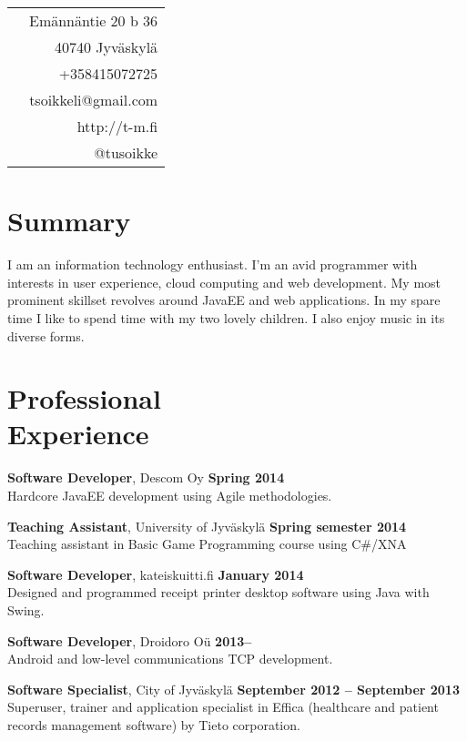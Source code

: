 \documentclass[margin,line]{resume}
\begin{document}
\begin{resume}

\hfill 
\begin{tabular}{l r}
  & Emännäntie 20 b 36 \\
  & 40740 Jyväskylä \\
  & +358415072725 \\
  & tsoikkeli@gmail.com \\
  & http://t-m.fi \\
  & @tusoikke 
\end{tabular}



 
\section{\mysidestyle Summary}
I am an information technology enthusiast. I'm an avid programmer with interests in user experience, cloud computing and web development. My most prominent skillset revolves around JavaEE and web applications. In my spare time I like to spend time with my two lovely children. I also enjoy music in its diverse forms.

\section{\mysidestyle Professional\\Experience}

\textbf{Software Developer}, Descom Oy
\hfill\textbf{Spring 2014}\\
Hardcore JavaEE development using Agile methodologies.

\textbf{Teaching Assistant}, University of Jyväskylä  
\hfill\textbf{Spring semester 2014} \\
Teaching assistant in Basic Game Programming course using C\#/XNA

\textbf{Software Developer}, kateiskuitti.fi
\hfill\textbf{January 2014} \\
Designed and programmed receipt printer desktop software using Java with Swing.

\textbf{Software Developer}, Droidoro Oü
\hfill\textbf{2013--}\\
Android and low-level communications TCP development.

\textbf{Software Specialist}, City of Jyväskylä
\hfill\textbf{September 2012 -- September 2013}\\
Superuser, trainer and application specialist in Effica (healthcare and patient records management software) by Tieto corporation.


\end{resume}
\end{document}
